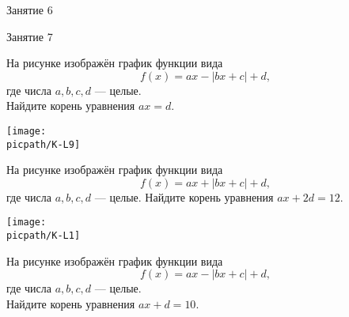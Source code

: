 \begin{class}[number=6]
	\begin{listofex}
		\item Занятие 6
	\end{listofex}
\end{class}

\begin{class}[number=7]
	\begin{listofex}
		\item Занятие 7
	\end{listofex}
\end{class}

\begin{homework}[number=1]
	\begin{listofex}
		\item
		\begin{minipage}[t]{\bodywidth}
			На рисунке изображён график функции вида \[ f(x)=ax-|bx+c|+d, \] где числа \(a, b, c, d\) --- целые.\\ Найдите корень уравнения \(ax=d\).
		\end{minipage}
		\hspace{0.02\linewidth}
		\begin{minipage}[t]{\picwidth}
			\texttt{[image: \\picpath/K-L9]}
		\end{minipage}
		\item
		\begin{minipage}[t]{\bodywidth}
			На рисунке изображён график функции вида \[ f(x)=ax+|bx+c|+d, \] где числа \(a, b, c, d\) --- целые. Найдите корень уравнения \(ax+2d=12\).
		\end{minipage}
		\hspace{0.02\linewidth}
		\begin{minipage}[t]{\picwidth}
			\texttt{[image: \\picpath/K-L1]}
		\end{minipage}
		\item
		\begin{minipage}[t]{\bodywidth}
			На рисунке изображён график функции вида \[ f(x)=ax-|bx+c|+d, \] где числа \(a, b, c, d\) --- целые.\\ Найдите корень уравнения \(ax+d=10\).
		\end{minipage}
		\hspace{0.02\linewidth}
		\begin{minipage}[t]{\picwidth}

\end{minipage}
\end{listofex}
\end{homework}
